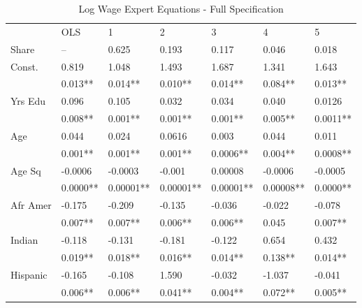 \documentclass[12pt]{article}
\begin{document}
\begin{table} \centering
  \caption{Log Wage Expert Equations - Full Specification}
  \begin{threeparttable}
    \begin{tabular}[l]{l l l l l l l}
      \cmidrule{1-7}

                  & OLS      & 1       & 2 &3 &4 & 5  \\
      \cmidrule{1-7}

      Share       & --       & 0.625   & 0.193   & 0.117   & 0.046   & 0.018    \\[0.3cm]

      Const.      & 0.819    & 1.048   & 1.493   & 1.687   & 1.341   & 1.643    \\
                  & 0.013**  & 0.014** & 0.010** & 0.014** & 0.084** & 0.013**  \\[0.3cm]
      
      Yrs Edu     & 0.096    & 0.105   & 0.032   & 0.034   & 0.040   & 0.0126   \\
                  & 0.008**  & 0.001** & 0.001** & 0.001** & 0.005** & 0.0011** \\[0.3cm]

      Age         & 0.044    & 0.024   & 0.0616  & 0.003   & 0.044   & 0.011    \\
                  & 0.001**  & 0.001** & 0.001** & 0.0006**& 0.004** & 0.0008** \\[0.3cm]

      Age Sq      & -0.0006  & -0.0003 & -0.001  & 0.00008 & -0.0006 & -0.0005  \\
                  & 0.0000** &0.00001**&0.00001**&0.00001**&0.00008**& 0.0000** \\[0.3cm]

      Afr Amer    & -0.175   & -0.209  & -0.135  & -0.036  & -0.022  & -0.078   \\
                  & 0.007**  & 0.007** & 0.006** & 0.006** & 0.045   &  0.007** \\[0.3cm]

      Indian      & -0.118   & -0.131  & -0.181  & -0.122  & 0.654  & 0.432     \\
                  & 0.019**  & 0.018** & 0.016** & 0.014** & 0.138**& 0.014**   \\[0.3cm]

      Hispanic    & -0.165   & -0.108  & 1.590   & -0.032  & -1.037 & -0.041    \\
                  & 0.006**  & 0.006** & 0.041** & 0.004** & 0.072**& 0.005**   \\[0.3cm]


\end{tabular}
\end{threeparttable}
\end{table}
\end{document}
